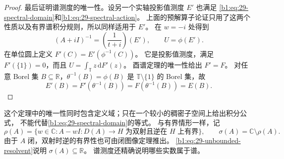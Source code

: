 \begin{proof}
最后证明谱测度的唯一性。设另一个实轴投影值测度 \(E'\) 也满足
\eqref{b1:eq:29-spectral-domain}和\eqref{b1:eq:29-spectral-action}。
上面的预解算子论证只用了这两个性质以及有界谱积分规则，所以同样适用于 \(E'\)。
在 \(w=-i\) 处得到
\[
 (A+iI)^{-1}=\left(\frac1{t+i}\right)(E'),\qquad U=\phi(E').
\]
在单位圆上定义 \(F'(C)=E'(\phi^{-1}(C))\)。
它是投影值测度，满足 \(F'(\{1\})=0\)，而且
\(U=\int_{\mathbb T}z\,\mathrm dF'(z)\)。
酉谱定理的唯一性给出 \(F'=F\)。
对任意 Borel 集 \(B\subseteq\mathbb R\)，\(\theta^{-1}(B)=\phi(B)\)
是 \(\mathbb T\setminus\{1\}\) 的 Borel 集，故
\[
 E'(B)=F'(\theta^{-1}(B))=F(\theta^{-1}(B))=E(B).
\]
\end{proof}

这个定理中的唯一性同时包含定义域；只在一个较小的稠密子空间上给出积分公式，
不能代替\eqref{b1:eq:29-spectral-domain}的等式。
与有界情形一样，记
\[
 \rho(A)=\{w\in\mathbb C:A-wI:D(A)\to H
       \text{ 为双射且逆在 }H\text{ 上有界}\},\qquad
 \sigma(A)=\mathbb C\setminus\rho(A).
\]
由于 \(A\) 闭，双射时逆的有界性也可由闭图像定理推出。
\eqref{b1:eq:29-unbounded-resolvent}说明 \(\sigma(A)\subseteq\mathbb R\)。
谱测度还精确说明哪些实数属于谱。

